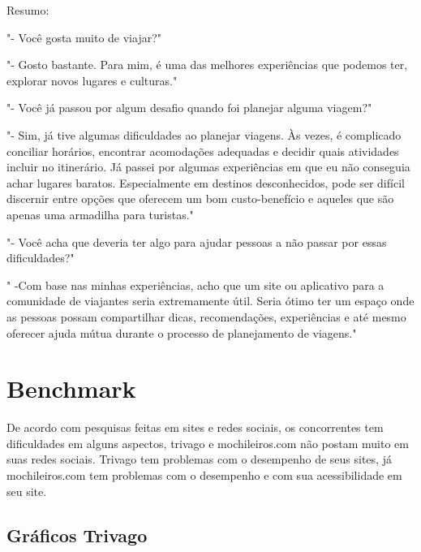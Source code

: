 \documentclass{article}
\begin{document}
Resumo:

"- Você gosta muito de viajar?"

"- Gosto bastante. Para mim, é uma das melhores experiências que podemos ter, explorar novos lugares e culturas."

"- Você já passou por algum desafio quando foi planejar alguma viagem?"

"- Sim, já tive algumas dificuldades ao planejar viagens. Às vezes, é complicado conciliar horários, encontrar acomodações adequadas e decidir quais atividades incluir no itinerário.
Já passei por algumas experiências em que eu não conseguia achar lugares baratos. Especialmente em destinos desconhecidos, pode ser difícil discernir entre opções que oferecem um bom custo-benefício e aqueles que são apenas uma armadilha para turistas."

"- Você acha que deveria ter algo para ajudar pessoas a não passar por essas dificuldades?"

" -Com base nas minhas experiências, acho que um site ou aplicativo para a comunidade de viajantes seria extremamente útil. Seria ótimo ter um espaço onde as pessoas possam compartilhar dicas, recomendações, experiências e até mesmo oferecer ajuda mútua durante o processo de planejamento de viagens."

\bigskip

\section{Benchmark}
De acordo com pesquisas feitas em sites e redes sociais, os concorrentes tem dificuldades em alguns aspectos, trivago e mochileiros.com não postam muito em suas redes sociais.
Trivago tem problemas com o desempenho de seus sites, já mochileiros.com tem problemas com o desempenho e com sua acessibilidade em seu site.

\subsection{Gráficos Trivago}
\end{document}
